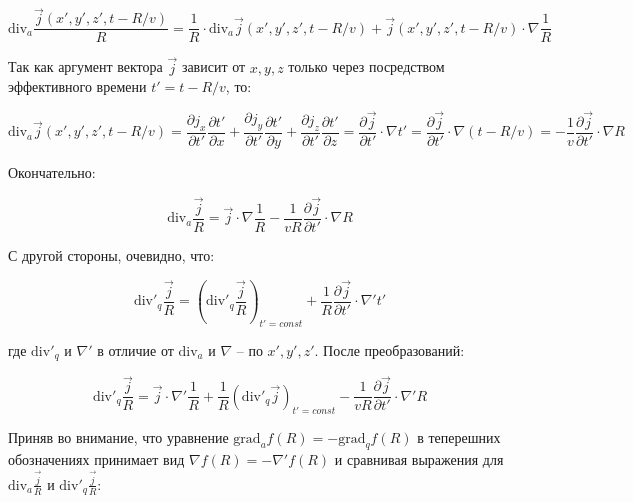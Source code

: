 \documentclass[12pt, a4paper]{article}
\begin{document}
\begin{equation}
\text{div}_a \frac{\vec{j}(x', y', z', t - R/v)}{R} = \frac{1}{R} \cdot \text{div}_a \vec{j}(x', y', z', t - R/v) + \vec{j}(x', y', z', t - R/v) \cdot \nabla \frac{1}{R}
\label{eq:div_j_retarded}
\end{equation}

Так как аргумент вектора $\vec{j}$ зависит от $x, y, z$ только через посредством эффективного времени $t' = t - R/v$, то:

\begin{equation}
\text{div}_a \vec{j}(x', y', z', t - R/v) = \frac{\partial j_x}{\partial t'} \frac{\partial t'}{\partial x} + \frac{\partial j_y}{\partial t'} \frac{\partial t'}{\partial y} + \frac{\partial j_z}{\partial t'} \frac{\partial t'}{\partial z} = \frac{\partial \vec{j}}{\partial t'} \cdot \nabla t' = \frac{\partial \vec{j}}{\partial t'} \cdot \nabla (t - R/v) = -\frac{1}{v} \frac{\partial \vec{j}}{\partial t'} \cdot \nabla R
\label{eq:div_j_time}
\end{equation}

Окончательно:

\begin{equation}
\text{div}_a \frac{\vec{j}}{R} = \vec{j} \cdot \nabla \frac{1}{R} - \frac{1}{vR} \frac{\partial \vec{j}}{\partial t'} \cdot \nabla R
\label{eq:div_j_final}
\end{equation}

С другой стороны, очевидно, что:

\begin{equation}
\text{div}'_q \frac{\vec{j}}{R} = \left( \text{div}'_q \frac{\vec{j}}{R} \right)_{t'=const} + \frac{1}{R} \frac{\partial \vec{j}}{\partial t'} \cdot \nabla' t'
\label{eq:div_q_j}
\end{equation}

где $\text{div}'_q$ и $\nabla'$ в отличие от $\text{div}_a$ и $\nabla$ -- по $x', y', z'$. После преобразований:

\begin{equation}
\text{div}'_q \frac{\vec{j}}{R} = \vec{j} \cdot \nabla' \frac{1}{R} + \frac{1}{R} (\text{div}'_q \vec{j})_{t'=const} - \frac{1}{vR} \frac{\partial \vec{j}}{\partial t'} \cdot \nabla' R
\label{eq:div_q_j_expanded}
\end{equation}

Приняв во внимание, что уравнение $\text{grad}_a f(R) = -\text{grad}_q f(R)$ в теперешних обозначениях принимает вид $\nabla f(R) = -\nabla' f(R)$ и сравнивая выражения для $\text{div}_a \frac{\vec{j}}{R}$ и $\text{div}'_q \frac{\vec{j}}{R}$:
\end{document}
